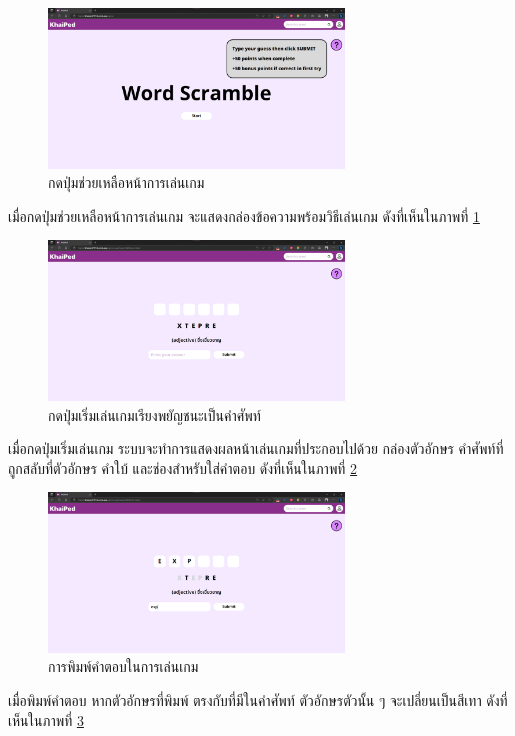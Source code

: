 \documentclass[12pt,oneside,openright,a4paper]{cpe-thai-project}
\begin{document}
\begin{figure}[!h]\centering
	\includegraphics[width=0.7\textwidth, keepaspectratio=true]{image/chap4/UI/game/help.png}
	\caption{{กดปุ่มช่วยเหลือหน้าการเล่นเกม}}\label{fig:chap4UIGameHelp}
\end{figure}
\hspace{1cm}
เมื่อกดปุ่มช่วยเหลือหน้าการเล่นเกม จะแสดงกล่องข้อความพร้อมวิธีเล่นเกม ดังที่เห็นในภาพที่ \ref{fig:chap4UIGameHelp}

\pagebreak
\begin{figure}[!h]\centering
	\includegraphics[width=0.7\textwidth, keepaspectratio=true]{image/chap4/UI/game/start.png}
	\caption{{กดปุ่มเริ่มเล่นเกมเรียงพยัญชนะเป็นคำศัพท์}}\label{fig:chap4UIGameStart}
\end{figure}
\hspace{1cm}
เมื่อกดปุ่มเริ่มเล่นเกม ระบบจะทำการแสดงผลหน้าเล่นเกมที่ประกอบไปด้วย กล่องตัวอักษร คำศัพท์ที่ถูกสลับที่ตัวอักษร
คำใบ้ และช่องสำหรับใส่คำตอบ ดังที่เห็นในภาพที่ \ref{fig:chap4UIGameStart}

\begin{figure}[!h]\centering
	\includegraphics[width=0.7\textwidth, keepaspectratio=true]{image/chap4/UI/game/type.png}
	\caption{{การพิมพ์คำตอบในการเล่นเกม}}\label{fig:chap4UIGameType}
\end{figure}
\hspace{1cm}
เมื่อพิมพ์คำตอบ หากตัวอักษรที่พิมพ์ ตรงกับที่มีในคำศัพท์ ตัวอักษรตัวนั้น ๆ จะเปลี่ยนเป็นสีเทา
ดังที่เห็นในภาพที่ \ref{fig:chap4UIGameType}
\end{document}

